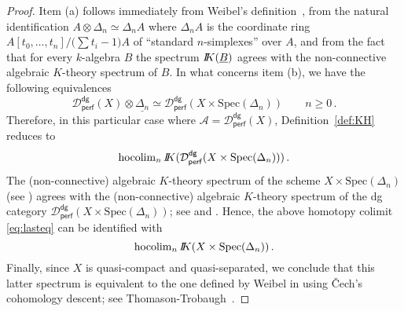 \documentclass{amsart}
\numberwithin{equation}{subsection}
\theoremstyle{remark}
\theoremstyle{remark}
\theoremstyle{remark}
\theoremstyle{remark}
\begin{document}
\begin{proof}
Item (a) follows immediately from Weibel's definition~\cite[Definition~1.1]{Weibel-KH}, from the natural identification $ A \otimes \Delta_n \simeq \Delta_nA$ where $\Delta_nA$ is the coordinate ring $A[t_0, \dots, t_n] / \big(\sum t_i -1\big)A$ of ``standard $n$-simplexes'' over $A$, and from the fact that for every $k$-algebra $B$ the spectrum ${I\mspace{-6.mu}K}(\underline{B})$ agrees with the non-connective algebraic $K$-theory spectrum of $B$. In what concerns item (b), we have the following equivalences
\begin{equation*}
{{\mathcal D}}_{\mathsf{perf}}^{\mathsf{dg}}(X) \otimes \underline{\Delta_n} \simeq {{\mathcal D}}_{\mathsf{perf}}^{\mathsf{dg}}(X \times \mathrm{Spec}(\Delta_n)) \qquad n \geq 0\,.
\end{equation*}
Therefore, in this particular case where ${{\mathcal A}}={{\mathcal D}}_{\mathsf{perf}}^{\mathsf{dg}}(X)$, Definition~\eqref{def:KH} reduces to
\begin{equation}\label{eq:lasteq}
\mathrm{hocolim}_n\, {I\mspace{-6.mu}K}({{\mathcal D}}_{\mathsf{perf}}^{\mathsf{dg}}(X \times \mathrm{Spec}(\Delta_n)))\,.
\end{equation}
The (non-connective) algebraic $K$-theory spectrum of the scheme $X \times \mathrm{Spec}(\Delta_n)$ (see \cite[\S6.5 and \S12.1]{Negative}) agrees with the (non-connective) algebraic $K$-theory spectrum of the dg category ${{\mathcal D}}_{\mathsf{perf}}^{\mathsf{dg}}(X \times \mathrm{Spec}(\Delta_n))$; see \cite[Theorem~5.1]{ICM} and \cite[\S8 Theorem~5]{Negative}. Hence, the above homotopy colimit \eqref{eq:lasteq} can be identified with
\begin{equation*}
\mathrm{hocolim}_n\, {I\mspace{-6.mu}K}(X \times \mathrm{Spec}(\Delta_n))\,.
\end{equation*}
Finally, since $X$ is quasi-compact and quasi-separated, we conclude that this latter spectrum is equivalent to the one defined by Weibel in \cite[Definition~6.5]{Weibel-KH} using \v{C}ech's cohomology descent; see Thomason-Trobaugh~\cite[\S9.11]{Thomason}.
\end{proof}
\end{document}
